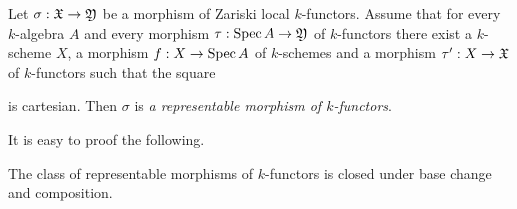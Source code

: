 \begin{definition}
Let $\sigma:{\mathfrak X}\rightarrow {\mathfrak Y}$ be a morphism of Zariski local $k$-functors. Assume that for every $k$-algebra $A$ and every morphism $\tau:\mathrm{Spec}\, A\rightarrow {\mathfrak Y}$ of $k$-functors there exist a $k$-scheme $X$, a morphism $f:X\rightarrow \mathrm{Spec}\, A$ of $k$-schemes and a morphism $\tau':X\rightarrow {\mathfrak X}$ of $k$-functors such that the square
\begin{center}
\end{center}
is cartesian. Then $\sigma$ is \textit{a representable morphism of $k$-functors}.
\end{definition}
\noindent
It is easy to proof the following. 

\begin{fact}\label{fact:representable_morphisms_under_base_change_and_composition}
The class of representable morphisms of $k$-functors is closed under base change and composition.
\end{fact}

